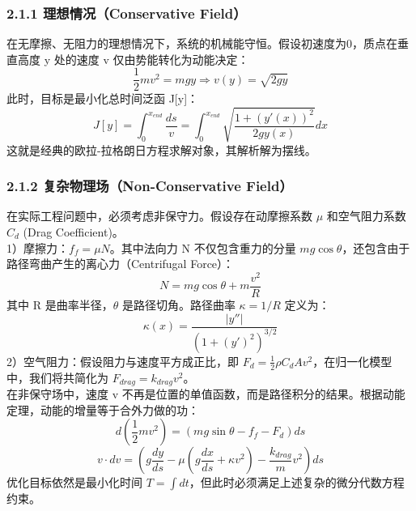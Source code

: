 \documentclass[twocolumn, 12pt]{article} %
\begin{document}
	\subsubsection{2.1.1 理想情况（Conservative Field）}
	在无摩擦、无阻力的理想情况下，系统的机械能守恒。假设初速度为0，质点在垂直高度 y 处的速度 v 仅由势能转化为动能决定：
	\begin{equation}
		\frac{1}{2}mv^2 = mgy \Rightarrow v(y) = \sqrt{2gy}
	\end{equation}
	此时，目标是最小化总时间泛函 J[y]：
	\begin{equation}
		J[y] = \int_{0}^{x_{end}} \frac{ds}{v} = \int_{0}^{x_{end}} \sqrt{\frac{1+(y'(x))^2}{2gy(x)}} dx
	\end{equation}
	这就是经典的欧拉-拉格朗日方程求解对象，其解析解为摆线。
	
	\subsubsection{2.1.2 复杂物理场（Non-Conservative Field）}
	在实际工程问题中，必须考虑非保守力。假设存在动摩擦系数 $\mu$ 和空气阻力系数 $C_d$ (Drag Coefficient)。\\
	1）摩擦力：$f_f = \mu N$。其中法向力 N 不仅包含重力的分量 $mg\cos\theta$，还包含由于路径弯曲产生的离心力（Centrifugal Force）：
	\begin{equation}
		N = mg\cos\theta + m\frac{v^2}{R}
	\end{equation}
	其中 R 是曲率半径，$\theta$ 是路径切角。路径曲率 $\kappa = 1/R$ 定义为：
	\begin{equation}
		\kappa(x) = \frac{|y''|}{(1+(y')^2)^{3/2}}
	\end{equation}
	2）空气阻力：假设阻力与速度平方成正比，即 $F_d = \frac{1}{2}\rho C_d A v^2$，在归一化模型中，我们将共简化为 $F_{drag} = k_{drag}v^2$。\\
	在非保守场中，速度 v 不再是位置的单值函数，而是路径积分的结果。根据动能定理，动能的增量等于合外力做的功：
	\begin{equation}
		d(\frac{1}{2}mv^2) = (mg\sin\theta - f_f - F_d)ds
	\end{equation}
	\begin{equation}
		v \cdot dv = (g\frac{dy}{ds} - \mu(g\frac{dx}{ds} + \kappa v^2) - \frac{k_{drag}}{m}v^2)ds
	\end{equation}
	优化目标依然是最小化时间 $T = \int dt$，但此时必须满足上述复杂的微分代数方程约束。
	
\end{document}
